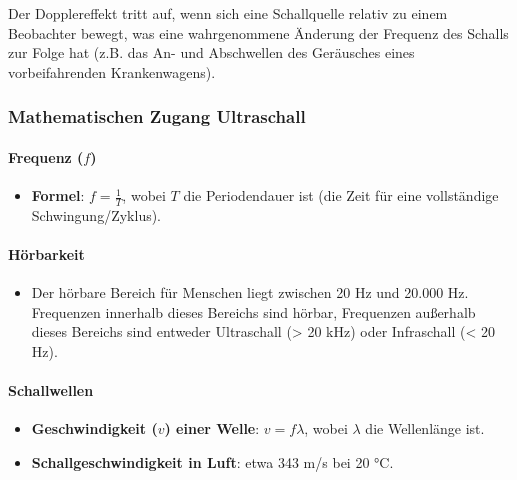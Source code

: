 \documentclass{vorlage-design-main}
\begin{document}
Der Dopplereffekt tritt auf, wenn sich eine Schallquelle relativ zu
einem Beobachter bewegt, was eine wahrgenommene Änderung der Frequenz
des Schalls zur Folge hat (z.B. das An- und Abschwellen des Geräusches
eines vorbeifahrenden Krankenwagens).

\hypertarget{mathematischen-zugang-ultraschall}{%
\subsubsection{Mathematischen Zugang
Ultraschall}\label{mathematischen-zugang-ultraschall}}

\hypertarget{frequenz-f}{%
\paragraph{\texorpdfstring{Frequenz
($f$)}{Frequenz (f)}}\label{frequenz-f}}

\begin{itemize}

\item
  \textbf{Formel}: $f = \frac{1}{T}$, wobei $T$ die Periodendauer
  ist (die Zeit für eine vollständige Schwingung/Zyklus).
\end{itemize}

\hypertarget{huxf6rbarkeit-1}{%
\paragraph{Hörbarkeit}\label{hoerbarkeit-1}}

\begin{itemize}

\item
  Der hörbare Bereich für Menschen liegt zwischen 20 Hz und 20.000 Hz.
  Frequenzen innerhalb dieses Bereichs sind hörbar, Frequenzen außerhalb
  dieses Bereichs sind entweder Ultraschall (\textgreater{} 20 kHz) oder
  Infraschall (\textless{} 20 Hz).
\end{itemize}

\hypertarget{schallwellen-1}{%
\paragraph{Schallwellen}\label{schallwellen-1}}

\begin{itemize}

\item
  \textbf{Geschwindigkeit ($v$) einer Welle}: $v = f \lambda$, wobei
  $\lambda$ die Wellenlänge ist.
\item
  \textbf{Schallgeschwindigkeit in Luft}: etwa 343 m/s bei 20 °C.
\end{itemize}
\end{document}
